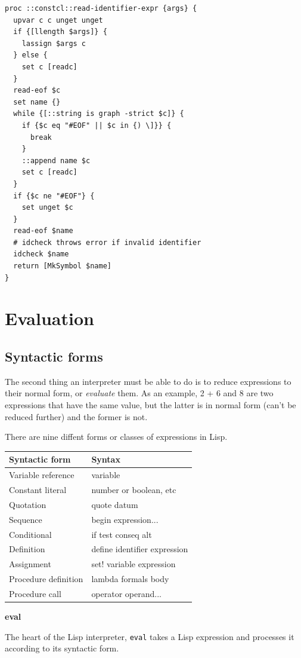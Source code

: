 \documentclass[twoside,9pt]{report}
\begin{document}
\noindent\makebox[\linewidth]{\rule{\linewidth}{0.4pt}}
\begin{lstlisting}
proc ::constcl::read-identifier-expr {args} {
  upvar c c unget unget
  if {[llength $args]} {
    lassign $args c
  } else {
    set c [readc]
  }
  read-eof $c
  set name {}
  while {[::string is graph -strict $c]} {
    if {$c eq "#EOF" || $c in {) \]}} {
      break
    }
    ::append name $c
    set c [readc]
  }
  if {$c ne "#EOF"} {
    set unget $c
  }
  read-eof $name
  # idcheck throws error if invalid identifier
  idcheck $name
  return [MkSymbol $name]
}
\end{lstlisting}
\noindent\makebox[\linewidth]{\rule{\linewidth}{0.4pt}}
\chapter{Evaluation}
\label{evaluation}
\section{Syntactic forms}
\label{syntactic-forms}

The second thing an interpreter must be able to do is to reduce expressions to their normal form, or \emph{evaluate} them. As an example, 2 + 6 and 8 are two expressions that have the same value, but the latter is in normal form (can't be reduced further) and the former is not.


There are nine diffent forms or classes of expressions in Lisp.

\begin{tabular}{|l l|}
\hline
Syntactic form & Syntax \\
\hline
Variable reference & variable \\
Constant literal & number or boolean, etc \\
Quotation & quote datum \\
Sequence & begin expression... \\
Conditional & if test conseq alt \\
Definition & define identifier expression \\
Assignment & set! variable expression \\
Procedure definition & lambda formals body \\
Procedure call & operator operand... \\
\hline
\end{tabular}


\textbf{eval}


The heart of the Lisp interpreter, \texttt{eval} takes a Lisp expression and processes it according to its syntactic form.
\end{document}
